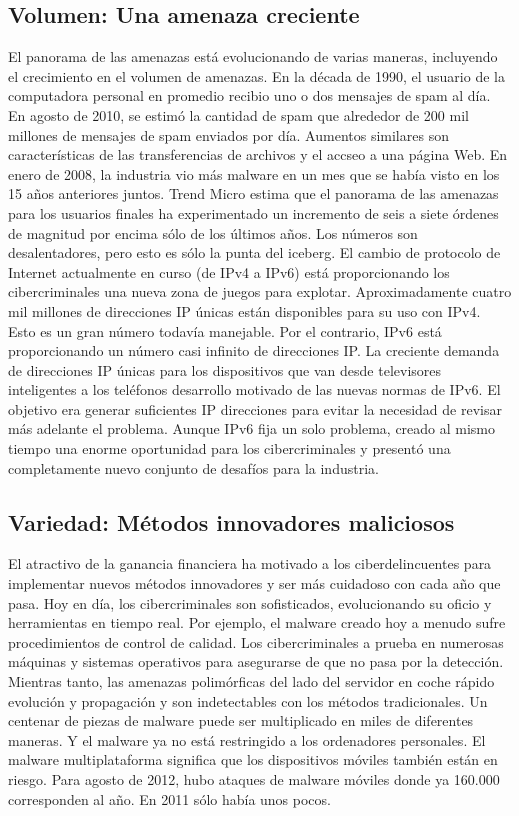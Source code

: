 \documentclass[journal]{IEEEtran}
\begin{document}
\subsection{Volumen: Una amenaza creciente}
El panorama de las amenazas está evolucionando de varias maneras, incluyendo el crecimiento en el volumen de amenazas. En la década de 1990, el usuario de la computadora personal en promedio recibio uno o dos mensajes de spam al día. En agosto de 2010, se estimó la cantidad de spam que alrededor de 200 mil millones de mensajes de spam enviados por día. Aumentos similares son características de las transferencias de archivos y el accseo a una página Web. En enero de 2008, la industria vio más malware en un mes que se había visto en los 15 años anteriores juntos. Trend Micro estima que el panorama de las amenazas para los usuarios finales ha experimentado un incremento de seis a siete órdenes de magnitud por encima sólo de los últimos años. Los números son desalentadores, pero esto es sólo la punta del iceberg. El cambio de protocolo de Internet actualmente en curso (de IPv4 a IPv6) está proporcionando los cibercriminales una nueva zona de juegos para explotar. Aproximadamente cuatro mil millones de direcciones IP únicas están disponibles para su uso con IPv4. Esto es un gran número todavía manejable. Por el contrario, IPv6 está proporcionando un número casi infinito de direcciones IP. La creciente demanda de direcciones IP únicas para los dispositivos que van desde televisores inteligentes a los teléfonos desarrollo motivado de las nuevas normas de IPv6. El objetivo era generar suficientes IP direcciones para evitar la necesidad de revisar más adelante el problema. Aunque IPv6 fija un solo problema, creado al mismo tiempo una enorme oportunidad para los cibercriminales y presentó una completamente nuevo conjunto de desafíos para la industria.
\subsection{Variedad: Métodos innovadores maliciosos}
El atractivo de la ganancia financiera ha motivado a los ciberdelincuentes para implementar nuevos métodos innovadores y ser más cuidadoso con cada año que pasa. Hoy en día, los cibercriminales son sofisticados, evolucionando su oficio y herramientas en tiempo real. Por ejemplo, el malware creado hoy a menudo sufre procedimientos de control de calidad. Los cibercriminales a prueba en numerosas máquinas y sistemas operativos para asegurarse de que no pasa por la detección. Mientras tanto, las amenazas polimórficas del lado del servidor en coche rápido evolución y propagación y son indetectables con los métodos tradicionales. Un centenar de piezas de malware puede ser multiplicado en miles de diferentes maneras. Y el malware ya no está restringido a los ordenadores personales. El malware multiplataforma significa que los dispositivos móviles también están en riesgo. Para agosto de 2012, hubo ataques de malware móviles donde ya 160.000 corresponden al año. En 2011 sólo había unos pocos.
\end{document}
